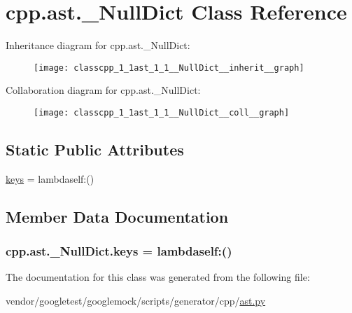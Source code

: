 \hypertarget{classcpp_1_1ast_1_1__NullDict}{}\section{cpp.\+ast.\+\_\+\+Null\+Dict Class Reference}
\label{classcpp_1_1ast_1_1__NullDict}


Inheritance diagram for cpp.\+ast.\+\_\+\+Null\+Dict\+:\nopagebreak
\begin{figure}[H]
\begin{center}
\leavevmode
\texttt{[image: classcpp\_1\_1ast\_1\_1\_\_NullDict\_\_inherit\_\_graph]}
\end{center}
\end{figure}


Collaboration diagram for cpp.\+ast.\+\_\+\+Null\+Dict\+:\nopagebreak
\begin{figure}[H]
\begin{center}
\leavevmode
\texttt{[image: classcpp\_1\_1ast\_1\_1\_\_NullDict\_\_coll\_\_graph]}
\end{center}
\end{figure}
\subsection*{Static Public Attributes}
\begin{DoxyCompactItemize}
\item 
\hyperlink{classcpp_1_1ast_1_1__NullDict_abb0b7884aa59bede0a8503dffcd1733f}{keys} = lambdaself\+:()
\end{DoxyCompactItemize}


\subsection{Member Data Documentation}
\subsubsection[{\texorpdfstring{keys}{keys}}]{\setlength{\rightskip}{0pt plus 5cm}cpp.\+ast.\+\_\+\+Null\+Dict.\+keys = lambdaself\+:()\hspace{0.3cm}{\ttfamily [static]}}\hypertarget{classcpp_1_1ast_1_1__NullDict_abb0b7884aa59bede0a8503dffcd1733f}{}\label{classcpp_1_1ast_1_1__NullDict_abb0b7884aa59bede0a8503dffcd1733f}


The documentation for this class was generated from the following file\+:\begin{DoxyCompactItemize}
\item 
vendor/googletest/googlemock/scripts/generator/cpp/\hyperlink{ast_8py}{ast.\+py}\end{DoxyCompactItemize}
